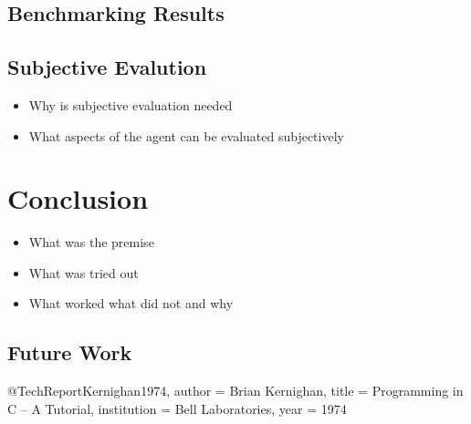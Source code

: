 \documentclass[english, version-2022-01]{uzl-thesis}
\begin{document}
\section{Benchmarking Results}

\section{Subjective Evalution}

\begin{itemize}
	\item Why is subjective evaluation needed
	\item What aspects of the agent can be evaluated subjectively
\end{itemize}

\chapter{Conclusion}

\begin{itemize}
	\item What was the premise
	\item What was tried out
	\item What worked what did not and why
\end{itemize}

\section{Future Work}

\begin{bibtex-entries}
@TechReport{Kernighan1974,
	author = {Brian Kernighan},
	title = {Programming in C – A Tutorial},
	institution = {Bell Laboratories},
	year = {1974}
}
\end{bibtex-entries}
\end{document}
